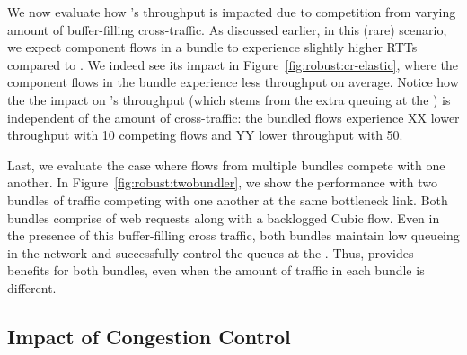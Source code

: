 
We now evaluate how \name's throughput is impacted due to competition from varying amount of buffer-filling cross-traffic.
As discussed earlier, in this (rare) scenario, we expect component flows in a bundle to experience slightly higher RTTs compared to \baseline.
We indeed see its impact in Figure~\ref{fig:robust:cr-elastic}, 
where the component flows in the bundle experience  \bundlerElasticTputWorseness less throughput on average. Notice how the the impact on \name's throughput (which stems from the extra queuing at the \inbox) is independent of the amount of cross-traffic: the bundled flows experience XX lower throughput with 10 competing flows and YY lower throughput with 50. 


 Last, we evaluate the case where flows from multiple bundles compete with one another. 
In Figure~\ref{fig:robust:twobundler}, we show the performance with two bundles of traffic competing with one another at the same bottleneck link. 
Both bundles comprise of web requests along with a backlogged Cubic flow. 
Even in the presence of this buffer-filling cross traffic,  both bundles maintain low queueing in the network and successfully control the queues at the \inbox.
Thus, \name provides benefits for both bundles, even when the amount of traffic in each bundle is different.  

\subsection{Impact of Congestion Control}\label{s:eval:cc}

